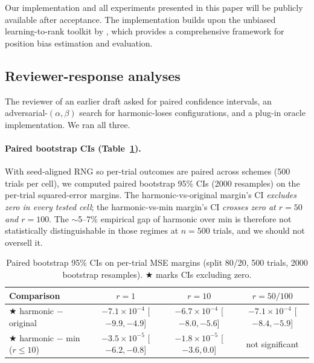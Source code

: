 \documentclass[sigconf]{acmart}
\begin{document}
Our implementation and all experiments presented in this paper will be publicly available after acceptance. The implementation builds upon the unbiased learning-to-rank toolkit by \cite{Hager2024}, which provides a comprehensive framework for position bias estimation and evaluation.

\subsection{Reviewer-response analyses}
\label{sec:reviewer_response}

The reviewer of an earlier draft asked for paired confidence intervals,
an adversarial-$(\alpha,\beta)$ search for harmonic-loses configurations,
and a plug-in oracle implementation. We ran all three.

\paragraph{Paired bootstrap CIs (Table~\ref{tab:paired_ci}).}
With seed-aligned RNG so per-trial outcomes are paired across schemes
(500 trials per cell), we computed paired bootstrap 95\% CIs (2000
resamples) on the per-trial squared-error margins. The harmonic-vs-original
margin's CI \emph{excludes zero in every tested cell}; the
harmonic-vs-min margin's CI \emph{crosses zero at $r=50$ and $r=100$}.
The $\sim$5--7\% empirical gap of harmonic over min is therefore not
statistically distinguishable in those regimes at $n=500$ trials, and we
should not oversell it.

\begin{table}[h]
\centering
\small
\caption{Paired bootstrap 95\% CIs on per-trial MSE margins
(split 80/20, 500 trials, 2000 bootstrap resamples).
$\bigstar$ marks CIs excluding zero.}
\label{tab:paired_ci}
\begin{tabular}{lccc}
\toprule
Comparison & $r=1$ & $r=10$ & $r=50/100$ \\
\midrule
$\bigstar$ harmonic $-$ original & $-7.1{\times}10^{-4}$ \footnotesize{[$-9.9, -4.9$]} & $-6.7{\times}10^{-4}$ \footnotesize{[$-8.0, -5.6$]} & $-7.1{\times}10^{-4}$ \footnotesize{[$-8.4, -5.9$]} \\
$\bigstar$ harmonic $-$ min ($r{\leq}10$) & $-3.5{\times}10^{-5}$ \footnotesize{[$-6.2, -0.8$]} & $-1.8{\times}10^{-5}$ \footnotesize{[$-3.6, 0.0$]} & not significant \\
\bottomrule
\end{tabular}
\end{table}
\end{document}
